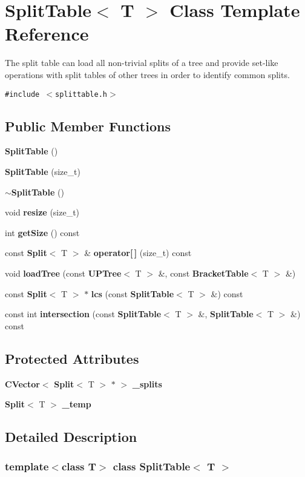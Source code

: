 \section{Split\-Table$<$ T $>$ Class Template Reference}
\label{classSplitTable}
The split table can load all non-trivial splits of a tree and provide set-like operations with split tables of other trees in order to identify common splits.  


{\tt \#include $<$splittable.h$>$}

\subsection*{Public Member Functions}
\begin{CompactItemize}
\item 
{\bf Split\-Table} ()
\item 
{\bf Split\-Table} (size\_\-t)
\item 
{\bf $\sim$Split\-Table} ()
\item 
void {\bf resize} (size\_\-t)
\item 
int {\bf get\-Size} () const 
\item 
const {\bf Split}$<$ T $>$ \& {\bf operator[$\,$]} (size\_\-t) const 
\item 
void {\bf load\-Tree} (const {\bf UPTree}$<$ T $>$ \&, const {\bf Bracket\-Table}$<$ T $>$ \&)
\item 
const {\bf Split}$<$ T $>$ $\ast$ {\bf lcs} (const {\bf Split\-Table}$<$ T $>$ \&) const 
\item 
const int {\bf intersection} (const {\bf Split\-Table}$<$ T $>$ \&, {\bf Split\-Table}$<$ T $>$ \&) const 
\end{CompactItemize}
\subsection*{Protected Attributes}
\begin{CompactItemize}
\item 
{\bf CVector}$<$ {\bf Split}$<$ T $>$ $\ast$ $>$ {\bf \_\-splits}
\item 
{\bf Split}$<$ T $>$ {\bf \_\-temp}
\end{CompactItemize}


\subsection{Detailed Description}
\subsubsection*{template$<$class T$>$ class Split\-Table$<$ T $>$}

